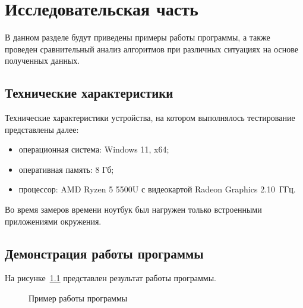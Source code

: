 \chapter{Исследовательская часть}

В данном разделе будут приведены примеры работы программы, а также проведен сравнительный анализ алгоритмов при различных ситуациях на основе полученных данных.

\section{Технические характеристики}

Технические характеристики устройства, на котором выполнялось тестирование представлены далее:
\begin{itemize}[label={---}]
	\item операционная система: Windows 11, x64;
	\item оперативная память: 8 Гб;
	\item процессор: AMD Ryzen 5 5500U с видеокартой Radeon Graphics 2.10~ГГц.
\end{itemize}

Во время замеров времени ноутбук был нагружен только встроенными приложениями окружения.

\section{Демонстрация работы программы}

На рисунке~\ref{img:run} представлен результат работы программы.

\begin{figure}[H]
	\caption{Пример работы программы}
	\label{img:run}
\end{figure}
\clearpage

